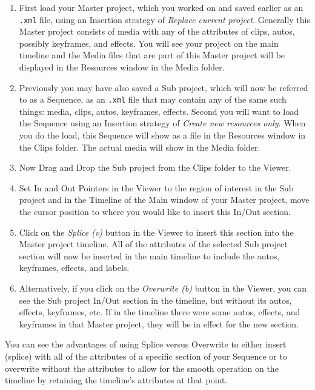\begin{enumerate}
    \item First load your Master project, which you worked on and saved earlier as an \texttt{.xml} file, using an Insertion strategy of \textit{Replace current project}.  Generally this Master project consists of media with any of the attributes of clips, autos, possibly keyframes, and effects.  You will see your project on the main timeline and the Media files that are part of this Master project will be displayed in the Resources window in the Media folder.
    \item Previously you may have also saved a Sub project, which will now be referred to as a Sequence, as an \texttt{.xml} file that may contain any of the same such things: media, clips, autos, keyframes, effects.  Second you will want to load the Sequence using an Insertion strategy of \textit{Create new resources only}.  When you do the load, this Sequence will show as a file in the Resources window in the Clips folder.  The actual media will show in the Media folder.
    \item Now Drag and Drop the Sub project from the Clips folder to the Viewer.
    \item Set In and Out Pointers in the Viewer to the region of interest in the Sub project and in the Timeline of the Main window of your Master project, move the cursor position to where you would like to insert this In/Out section.
    \item Click on the \textit{Splice (v)} button in the Viewer to insert this section into the Master project timeline.  All of the attributes of the selected Sub project section will now be inserted in the main timeline to include the autos, keyframes, effects, and labels.
    \item Alternatively, if you click on the \textit{Overwrite (b)} button in the Viewer, you can see the Sub project In/Out section in the timeline, but without its autos, effects, keyframes, etc.  If in the timeline there were some autos, effects, and keyframes in that Master project, they will be in effect for the new section.   
\end{enumerate}

You can see the advantages of using Splice versus Overwrite to either insert (splice) with all of the attributes of a specific section of your Sequence or to overwrite without the attributes to allow for the smooth operation on the timeline by retaining the timeline’s attributes at that point.


